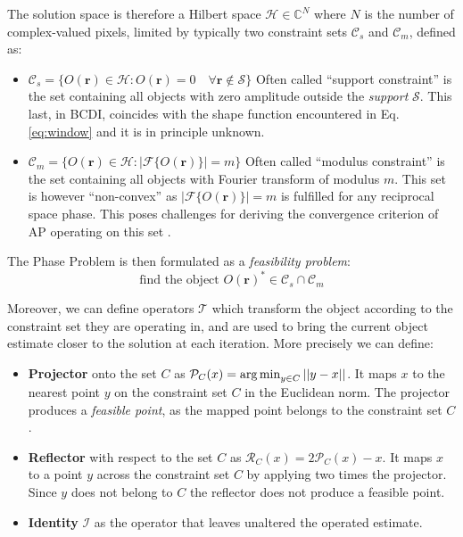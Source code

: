 The solution space is therefore a Hilbert space $\mathcal{H} \in \mathbb{C}^N$ where $N$ is the number of complex-valued pixels,
limited by typically two constraint sets $\mathcal{C}_s$ and $\mathcal{C}_m$, defined as:
\begin{itemize}
    \item $\mathcal{C}_s = \{ O(\mathbf{r}) \in \mathcal{H} : O(\mathbf{r}) = 0 \quad \forall \mathbf{r} \notin \mathcal{S} \}$ 
    Often called ``support constraint'' is the set containing all objects with zero amplitude outside the \textit{support} $\mathcal{S}$. 
    This last, in BCDI, coincides with the shape function encountered in Eq.\ref{eq:window} and it is in principle unknown.  

    \item $\mathcal{C}_m = \{ O(\mathbf{r}) \in \mathcal{H} : |\mathcal{F}\{O(\mathbf{r})\}| = m \}$ Often called ``modulus 
    constraint'' is the set containing all objects with Fourier transform of modulus $m$. This set is however ``non-convex''
    as $|\mathcal{F}\{O(\mathbf{r})\}| = m$ is fulfilled for any reciprocal space phase. This poses challenges for deriving 
    the convergence criterion of AP operating on this set \cite{Luke2002}.
    
\end{itemize}
The Phase Problem is then formulated as a \textit{feasibility problem}: 
\begin{equation}
    \text{find the object  } O(\mathbf{r})^{\ast} \in \mathcal{C}_s \cap \mathcal{C}_m
\end{equation}

Moreover, we can define operators $\mathbf{\mathcal{T}}$ which transform the object according to the constraint set 
they are operating in, and are used to bring the current object estimate closer to the solution at each iteration. 
More precisely we can define: 

\begin{itemize}

    \item \textbf{Projector} onto the set $C$ as $\mathcal{P}_C(x) = \operatorname*{arg\,min}_{y \in C} || y - x || $. It maps $x$ to the 
    nearest point $y$ on the constraint set $C$ in the Euclidean norm. The projector produces a \textit{feasible point}, 
    as the mapped point belongs to the constraint set $C$. 

    \item \textbf{Reflector} with respect to the set $C$ as $\mathcal{R}_C(x) = 2\mathcal{P}_C(x) - x$. It maps $x$ to 
    a point $y$ across the constraint set $C$ by applying two times the projector. Since $y$ does not belong to $C$ 
    the reflector does not produce a feasible point. 
    \item \textbf{Identity} $\mathcal{I}$ as the operator that leaves unaltered the operated estimate. 
\end{itemize}

